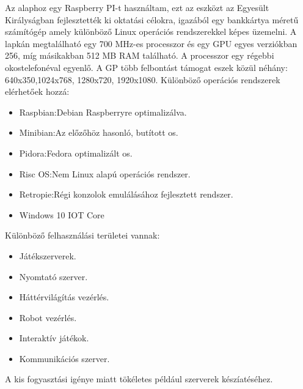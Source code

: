 \documentclass[a4paper,12pt,oneside]{report}
\begin{document}
Az alaphoz egy Raspberry PI-t használtam, ezt az eszközt az Egyesült Királyságban fejlesztették ki oktatási célokra, igazából
egy bankkártya méretű számítógép amely különböző Linux operációs rendszerekkel képes üzemelni. A lapkán megtalálható egy 700 MHz-es 
processzor és egy GPU egyes verziókban 256, míg másikakban 512 MB RAM található. A processzor egy régebbi okostelefonéval egyenlő.
A GP több felbontást támogat eszek közül néhány: 640x350,1024x768, 1280x720, 1920x1080.
Különböző operációs rendszerek elérhetőek hozzá:
\begin{itemize}

\item{Raspbian:Debian Raspberryre optimalizálva.}

\item{Minibian:Az előzőhöz hasonló, butított os.}

\item{Pidora:Fedora optimalizált os.}

\item{Risc OS:Nem Linux alapú operációs rendszer.}

\item{Retropie:Régi konzolok emulálásához fejlesztett rendszer.}

\item{Windows 10 IOT Core}

\end{itemize}

Különböző felhasználási területei vannak:
\begin{itemize}

\item{Játékszerverek.}
	
\item{Nyomtató szerver.}
	
\item{Háttérvilágítás vezérlés.}
	
\item{Robot vezérlés.}
	
\item{Interaktív játékok.}
	
\item{Kommunikációs szerver.}
	
\end{itemize}

A kis fogyasztási igénye miatt tökéletes például szerverek készíatéséhez.
\end{document}
